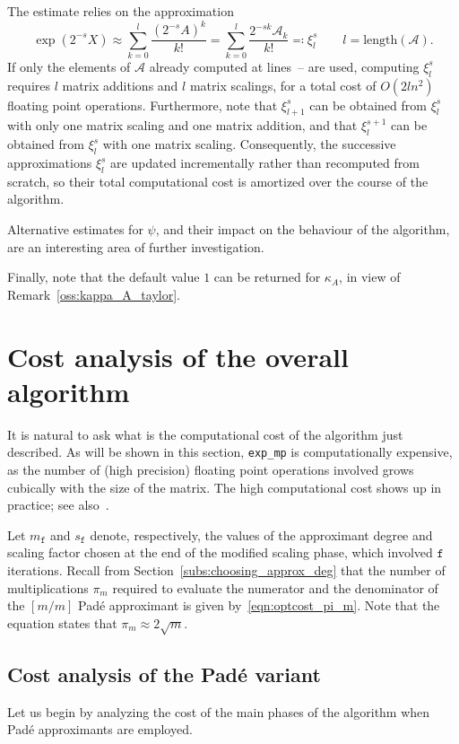 The estimate relies on the approximation
\[
	\exp(2^{-s}X)\approx\sum_{k=0}^l\frac{(2^{-s}A)^k}{k!}=\sum_{k=0}^{l}\frac{2^{-sk}\mathcal{A}_k}{k!}\eqqcolon\xi_l^s\qquad l=\text{length}(\mathcal{A}).	
\]
If only the elements of $\mathcal{A}$ already computed at lines~-- are used, computing $\xi_l^s$ requires $l$ matrix additions and $l$ matrix scalings, for a total cost of $O(2ln^2)$ floating point operations.
Furthermore, note that $\xi_{l+1}^s$ can be obtained from $\xi_l^s$ with only one matrix scaling and one matrix addition, and that $\xi_l^{s+1}$ can be obtained from $\xi_l^s$ with one matrix scaling. Consequently, the successive approximations $\xi_l^s$ are updated incrementally rather than recomputed from scratch, so their total computational cost is amortized over the course of the algorithm.

Alternative estimates for $\psi$, and their impact on the behaviour of the algorithm, are an interesting area of further investigation.
\smallskip

Finally, note that the default value $1$ can be returned for $\kappa_A$, in view of Remark~\ref{oss:kappa_A_taylor}.

\section{Cost analysis of the overall algorithm}\label{subs:cost_analysis}
It is natural to ask what is the computational cost of the algorithm just described. 
As will be shown in this section, \texttt{exp\_mp} is computationally expensive, as the number of (high precision) floating point operations involved grows cubically with the size of the matrix. The high computational cost shows up in practice; see also~\cite{higham:hf19_mpexpm}. 
\smallskip 

Let $m_{\mathtt{f}}$ and $s_{\mathtt{f}}$ denote, respectively, the values of the approximant degree and scaling factor chosen at the end of the modified scaling phase, which involved $\mathtt{f}$ iterations. Recall from Section~\ref{subs:choosing_approx_deg} that the number of multiplications $\pi_m$ required to evaluate the numerator and the denominator of the $[m/m]$ Padé approximant is given by~\eqref{eqn:optcost_pi_m}. Note that the equation states that $\pi_m\approx 2\sqrt{m}$. 

\subsection{Cost analysis of the Padé variant}
Let us begin by analyzing the cost of the main phases of the algorithm when Padé approximants are employed.

